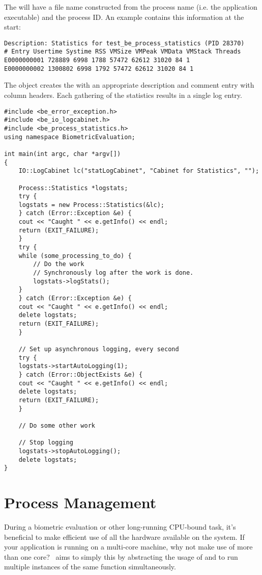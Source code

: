 The  will have a file name constructed from the process name (i.e.
the application executable) and the process ID. An example  contains
this information at the start:

\begin{verbatim}
Description: Statistics for test_be_process_statistics (PID 28370)
# Entry Usertime Systime RSS VMSize VMPeak VMData VMStack Threads
E0000000001 728889 6998 1788 57472 62612 31020 84 1
E0000000002 1300802 6998 1792 57472 62612 31020 84 1
\end{verbatim}

The  object creates the  with an appropriate description
and comment entry with column headers. Each gathering of the statistics results
in a single log entry.

\begin{lstlisting}[caption={Logging Process Statistics}, label=lst:processstatisticslogging]
#include <be_error_exception.h>
#include <be_io_logcabinet.h>
#include <be_process_statistics.h>
using namespace BiometricEvaluation;

int main(int argc, char *argv[])
{
    IO::LogCabinet lc("statLogCabinet", "Cabinet for Statistics", "");

    Process::Statistics *logstats;
    try {
	logstats = new Process::Statistics(&lc);
    } catch (Error::Exception &e) {
	cout << "Caught " << e.getInfo() << endl;
	return (EXIT_FAILURE);
    }
    try {
	while (some_processing_to_do) {
	    // Do the work
	    // Synchronously log after the work is done.
	    logstats->logStats();
	}
    } catch (Error::Exception &e) {
	cout << "Caught " << e.getInfo() << endl;
	delete logstats;
	return (EXIT_FAILURE);
    }

    // Set up asynchronous logging, every second
    try {
	logstats->startAutoLogging(1);
    } catch (Error::ObjectExists &e) {
	cout << "Caught " << e.getInfo() << endl;
	delete logstats;
	return (EXIT_FAILURE);
    }

    // Do some other work

    // Stop logging
    logstats->stopAutoLogging();
    delete logstats;
}
\end{lstlisting}

\section{Process Management}
\label{sec-process_management}

During a biometric evaluation or other long-running CPU-bound task, it's 
beneficial to make efficient use of all the hardware available on the system.
If your application is running on a multi-core machine, why not make use of
more than one core?  \sname\ aims to simply this by abstracting the usage of
 and  to run multiple instances of the same
function simultaneously.

